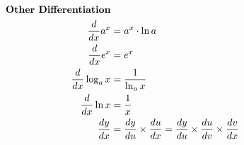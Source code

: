 \begin{align*}
  \text{\textbf{Other Differentiation}}                                                                                     \\
  \frac{d}{dx} a^x      & = a^x \cdot \ln a                                                                              \\
  \frac{d}{dx} e^x      & = e^x                                                                                          \\
  \frac{d}{dx} \log_a x & = \frac{1}{\ln_a x}                                                                            \\
  \frac{d}{dx} \ln x    & = \frac{1}{x}                                                                                  \\
  \frac{dy}{dx}         & = \frac{dy}{du} \times \frac{du}{dx} = \frac{dy}{du} \times \frac{du}{dv} \times \frac{dv}{dx}
\end{align*}